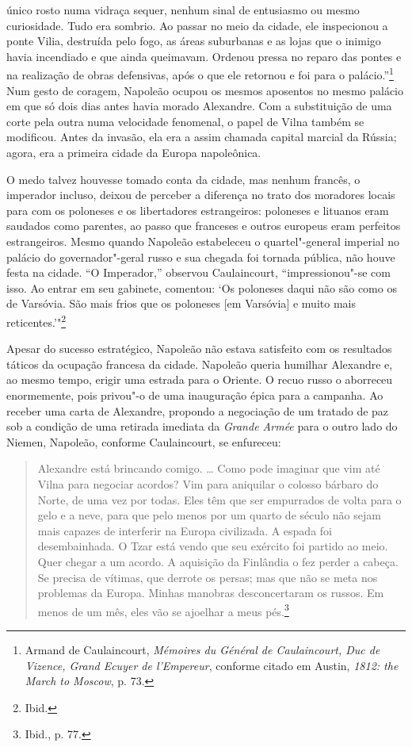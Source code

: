 único rosto numa vidraça sequer, nenhum sinal de entusiasmo ou mesmo
curiosidade. Tudo era sombrio. Ao passar no meio da cidade, ele
inspecionou a ponte Vilia, destruída pelo fogo, as áreas suburbanas e as
lojas que o inimigo havia incendiado e que ainda queimavam. Ordenou
pressa no reparo das pontes e na realização de obras defensivas, após o
que ele retornou e foi para o palácio.''\footnote{Armand de Caulaincourt, \textit{Mémoires du Général de Caulaincourt, Duc de Vizence, Grand Ecuyer de l'Empereur}, conforme citado em Austin, \textit{1812: the March to Moscow}, p. 73.} Num gesto de coragem, Napoleão ocupou os mesmos aposentos no mesmo palácio em que só dois dias
antes havia morado Alexandre. Com a substituição de uma corte pela outra
numa velocidade fenomenal, o papel de Vilna também se modificou. Antes
da invasão, ela era a assim chamada capital marcial da Rússia; agora,
era a primeira cidade da Europa napoleônica.

O medo talvez houvesse tomado conta da cidade, mas nenhum francês, o
imperador incluso, deixou de perceber a diferença no trato dos moradores
locais para com os poloneses e os libertadores estrangeiros: poloneses e
lituanos eram saudados como parentes, ao passo que franceses e outros
europeus eram perfeitos estrangeiros. Mesmo quando Napoleão estabeleceu
o quartel"-general imperial no palácio do governador"-geral russo e sua
chegada foi tornada pública, não houve festa na cidade. ``O Imperador,''
observou Caulaincourt, ``impressionou"-se com isso. Ao entrar em seu
gabinete, comentou: `Os poloneses daqui não são como os de Varsóvia. São
mais frios que os poloneses {[}em Varsóvia{]} e muito mais
reticentes.'"\footnote{Ibid.}

Apesar do sucesso estratégico, Napoleão não estava satisfeito com os
resultados táticos da ocupação francesa da cidade. Napoleão queria
humilhar Alexandre e, ao mesmo tempo, erigir uma estrada para o Oriente.
O recuo russo o aborreceu enormemente, pois privou"-o de uma inauguração
épica para a campanha. Ao receber uma carta de Alexandre, propondo a
negociação de um tratado de paz sob a condição de uma retirada imediata
da \textit{Grande Armée} para o outro lado do Niemen, Napoleão, conforme
Caulaincourt, se enfureceu:

%

\begin{quote}
Alexandre está brincando comigo. \ldots{} Como pode imaginar que vim até
Vilna para negociar acordos? Vim para aniquilar o colosso bárbaro do
Norte, de uma vez por todas. Eles têm que ser empurrados de volta para o
gelo e a neve, para que pelo menos por um quarto de século não sejam
mais capazes de interferir na Europa civilizada. A espada foi
desembainhada. O Tzar está vendo que seu exército foi partido ao meio.
Quer chegar a um acordo. A aquisição da Finlândia o fez perder a cabeça.
Se precisa de vítimas, que derrote os persas; mas que não se meta nos
problemas da Europa. Minhas manobras desconcertaram os russos. Em menos
de um mês, eles vão se ajoelhar a meus pés.\footnote{Ibid., p. 77.}
\end{quote}

